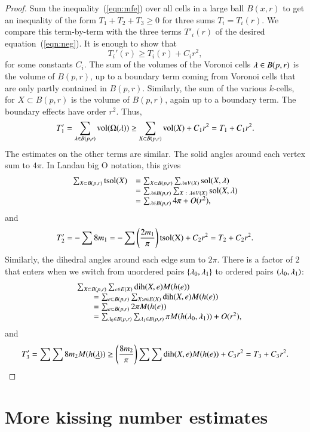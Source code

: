 \begin{proof}
Sum the inequality~(\ref{eqn:mfe}) over all cells in a large ball $B(x,r)$ to get an
inequality of the form $T_1 + T_2 + T_3\ge 0$ for three sums $T_i = T_i(r)$.  We compare this term-by-term
with the three terms $T'_i(r)$ of the desired equation~(\ref{eqn:neg}). 
It is enough to show that
$$
T_i'(r) \ge T_i(r) + C_i r^2,
$$
for some constants $C_i$.
The sum of the volumes of the Voronoi cells $\lambda\in B(p,r)$ is
the volume of $B(p,r)$, up to a boundary term coming from Voronoi cells
that are only partly contained in $B(p,r)$.  Similarly, the sum of
the various $k$-cells, for $X\subset B(p,r)$ is the volume of $B(p,r)$,
again up to a boundary term. The boundary effects have order $r^2$.
Thus,
$$
T_1'= \sum_{\lambda\in B(p,r)} {\operatorname{vol}}(\Omega(\lambda)) \ge \sum_{X\subset B(p,r)} {\operatorname{vol}}(X) + C_1 r^2 = T_1 + C_1 r^2.
$$
The estimates on the other terms are similar.  The solid angles
around each vertex sum to $4\pi$.
In Landau big O notation, this gives
$$
\begin{array}{lll}
\sum_{X\subset B(p,r)} {\operatorname{tsol}}(X) &= 
\sum_{X\subset B(p,r)} \sum_{\lambda\in V(X)} \operatorname{sol}(X,\lambda)\\
 &=\sum_{\lambda\in B(p,r)} \sum_{X\ :\  \lambda\in V(X)} \operatorname{sol}(X,\lambda)\\
 &=\sum_{\lambda\in B(p,r)} 4\pi    + O(r^2),
\end{array}
$$
and
$$
T_2' = -\sum 8 m_1 = -\sum\left(\frac{2m_1}\pi\right) {\operatorname{tsol(X)}} + C_2 r^2 = T_2 + C_2 r^2.
$$
Similarly, the dihedral angles around each edge sum to $2\pi$.  There is a factor of $2$ that enters when we switch from unordered pairs $\{\lambda_0,\lambda_1\}$ to ordered pairs $(\lambda_0,\lambda_1)$:
$$
\begin{array}{lll}
&\sum_{X\subset B(p,r)} \sum_{e\in E(X)} \operatorname{dih}(X,e)  M(h(e)) \\
&\qquad=\sum_{e\subset B(p,r)} \sum_{X: e\in E(X)} \operatorname{dih}(X,e)  M(h(e)) \\
 &\qquad=\sum_{e\subset B(p,r)} 2\pi M(h(e)) \\
 &\qquad=\sum_{\lambda_0\in B(p,r)} \sum_{\lambda_1\in B(p,r) } \pi M(h(\lambda_0,\lambda_1)) + O(r^2),\\
\end{array}
$$
and 
$$
T_3' = \sum\sum 8 m_2 M(h({\underline{\lambda}})) \ge \left(\frac{8m_2}\pi\right)
\sum\sum\operatorname{dih}(X,e) M(h(e)) + C_3 r^2 = T_3 + C_3 r^2.
$$
\end{proof}




\section{More kissing number estimates}

